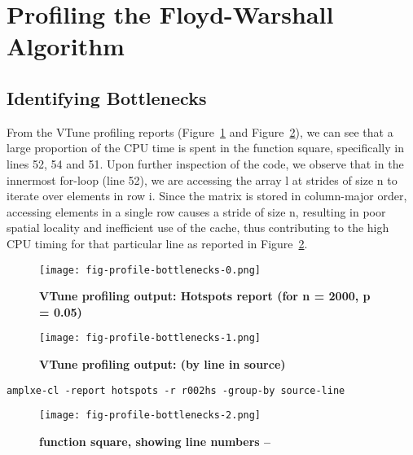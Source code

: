 
\section{Profiling the Floyd-Warshall Algorithm}
\label{sec-profile}

\subsection{Identifying Bottlenecks}
\label{sec-profile-bottlenecks}

From the VTune profiling reports (Figure~\ref{fig-profile-bottlenecks-0}
and Figure~\ref{fig-profile-bottlenecks-1}), we can see that a large
proportion of the CPU time is spent in the function square, specifically
in lines 52, 54 and 51. Upon further inspection of the code, we observe
that in the innermost for-loop (line 52), we are accessing the array l at
strides of size n to iterate over elements in row i. Since the matrix is
stored in column-major order, accessing elements in a single row causes a
stride of size n, resulting in poor spatial locality and inefficient use
of the cache, thus contributing to the high CPU timing for that
particular line as reported in Figure~\ref{fig-profile-bottlenecks-1}.

\begin{figure}[h]
  \centering
  \texttt{[image: fig-profile-bottlenecks-0.png]}
  \caption{\textbf{VTune profiling output: Hotspots report (for n = 2000,
      p = 0.05)}}
  \label{fig-profile-bottlenecks-0}
\end{figure}

\begin{figure}[h]
  \centering
  \texttt{[image: fig-profile-bottlenecks-1.png]}
  \caption{\textbf{VTune profiling output: (by line in source)}}
  \label{fig-profile-bottlenecks-1}
\end{figure}

\begin{center}
  \texttt{amplxe-cl -report hotspots -r r002hs -group-by source-line}
\end{center}

\begin{figure}[h]
  \centering
  \texttt{[image: fig-profile-bottlenecks-2.png]}
  \caption{\textbf{function square, showing line numbers --}}
  \label{fig-profile-bottlenecks-2}
\end{figure}

